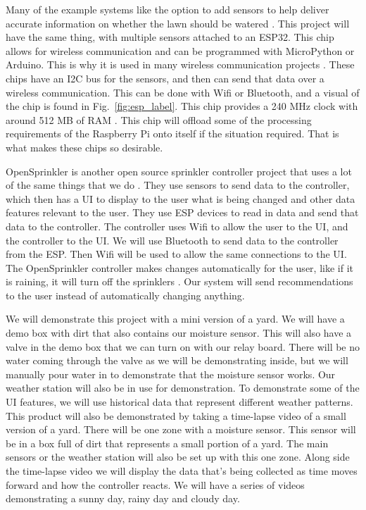 \documentclass[letterpaper, 10 pt, conference]{ieeeconf}  %
\begin{document}
Many of the example systems like the option to add sensors to help deliver accurate information on whether the lawn should be watered \cite{OpenSprinkler}. This project will have the same thing, with multiple sensors attached to an ESP32. This chip allows for wireless communication and can be programmed with MicroPython or Arduino. This is why it is used in many wireless communication projects \cite{OpenSprinkler}. These chips have an I2C bus for the sensors, and then can send that data over a wireless communication. This can be done with Wifi or Bluetooth, and a visual of the chip is found in Fig.~\ref{fig:esp_label}. This chip provides a 240 MHz clock with around 512 MB of RAM \cite{micropy}. This chip will offload some of the processing requirements of the Raspberry Pi onto itself if the situation required. That is what makes these chips so desirable. 

OpenSprinkler is another open source sprinkler controller project that uses a lot of the same things that we do \cite{OpenSprinkler}. They use sensors to send data to the controller, which then has a UI to display to the user what is being changed and other data features relevant to the user. They use ESP devices to read in data and send that data to the controller. The controller uses Wifi to allow the user to the UI, and the controller to the UI. We will use Bluetooth to send data to the controller from the ESP. Then Wifi will be used to allow the same connections to the UI. The OpenSprinkler controller makes changes automatically for the user, like if it is raining, it will turn off the sprinklers \cite{OpenSprinkler}. Our system will send recommendations to the user instead of automatically changing anything. 

We will demonstrate this project with a mini version of a yard. We will have a demo box with dirt that also contains our moisture sensor. This will also have a valve in the demo box that we can turn on with our relay board. There will be no water coming through the valve as we will be demonstrating inside, but we will manually pour water in to demonstrate that the moisture sensor works. Our weather station will also be in use for demonstration. To demonstrate some of the UI features, we will use historical data that represent different weather patterns. This product will also be demonstrated by taking a time-lapse video of a small version of a yard. There will be one zone with a moisture sensor. This sensor will be in a box full of dirt that represents a small portion of a yard. The main sensors or the weather station will also be set up with this one zone.  Along side the time-lapse video we will display the data that's being collected as time moves forward and how the controller reacts. We will have a series of videos demonstrating a sunny day, rainy day and cloudy day.
\end{document}
